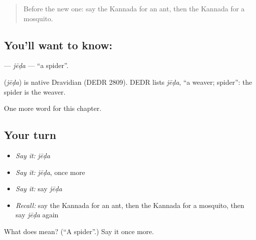 \begin{quote}
Before the new one: say the Kannada for an ant, then the Kannada for a mosquito.
\end{quote}

\subsection*{You'll want to know: }
\textbf{} — \emph{jēḍa} — \textquotedblleft{}a spider\textquotedblright{}.

\begin{cousinweb}
\textbf{} (\emph{jēḍa}) is native Dravidian (DEDR 2809). DEDR lists \emph{jēḍa}, \textquotedblleft{}a weaver; spider\textquotedblright{}: the spider is the weaver.
\end{cousinweb}

\begin{grammarlens}[title={What you've built}]
One more word for this chapter.
\end{grammarlens}

\subsection*{Your turn}
\begin{itemize}
\raggedright
  \item \emph{Say it:} \emph{jēḍa}
  \item \emph{Say it:} \emph{jēḍa}, once more
  \item \emph{Say it:} say \emph{jēḍa}
  \item \emph{Recall:} say the Kannada for an ant, then the Kannada for a mosquito, then say \emph{jēḍa} again
\end{itemize}

\begin{tcolorbox}[breakable,colback=teal!4,colframe=teal!35!black,title={Before you move on}]
What does  mean? (\textquotedblleft{}A spider\textquotedblright{}.) Say it once more.
\end{tcolorbox}
